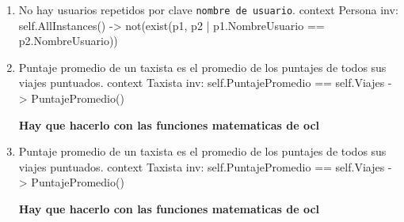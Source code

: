 \begin{enumerate}
	\item \begin{ocl}{No hay usuarios repetidos por clave \texttt{nombre de usuario}.}
		  context Persona
		  inv: self.AllInstances() -> not(exist(p1, p2 | p1.NombreUsuario == p2.NombreUsuario))
		\end{ocl}

	\item \begin{ocl}{Puntaje promedio de un taxista es el promedio de los puntajes de todos sus viajes puntuados.}
		  context Taxista
		  inv: self.PuntajePromedio == self.Viajes -> PuntajePromedio()
		\end{ocl}
		\textbf{Hay que hacerlo con las funciones matematicas de ocl}

	\item \begin{ocl}{Puntaje promedio de un taxista es el promedio de los puntajes de todos sus viajes puntuados.}
		  context Taxista
		  inv: self.PuntajePromedio == self.Viajes -> PuntajePromedio()
		\end{ocl}
		\textbf{Hay que hacerlo con las funciones matematicas de ocl}

\end{enumerate}
